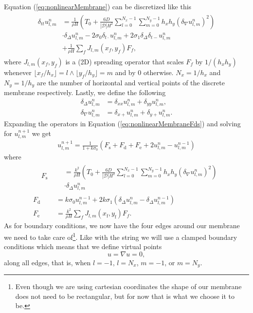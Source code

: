 \documentclass{article}
\begin{document}
Equation (\ref{eq:nonlinearMembrane}) can be discretized like this
\begin{align}
  \label{eq:nonlinearMembraneFds}
  \begin{split}
  \delta_{tt} u^n_{l, m} &= \frac{1}{\rho H} \left(T_0 + \frac{6D}{|\mathcal{D}| H^2} \sum_{l=0}^{N_x-1}\sum_{m=0}^{N_y-1} h_x h_y (\delta_\nabla u^n_{l, m})^2 \right)\\
  &\cdot\delta_\Delta u^n_{l, m}- 2 \sigma_0 \delta_{t\cdot} u^n_{l, m} + 2 \sigma_1 \delta_\Delta \delta_{t-} u^n_{l, m}\\
  &+\frac{1}{\rho H}\sum_f J_{l, m}(x_f, y_f) F_f,
  \end{split}
\end{align}
where $J_{l, m}(x_f,y_f)$ is a (2D) spreading operator that scales $F_f$ by $1/(h_x h_y)$ whenever $\lfloor x_f / h_x \rfloor = l \land \lfloor y_f / h_y \rfloor = m$ and by $0$ otherwise. $N_x = 1/h_x$ and $N_y=1/h_y$ are the number of horizontal and vertical points of the discrete membrane respectively. Lastly, we define the following
\begin{align}
  \delta_\Delta u^n_{l, m} &= \delta_{xx} u^n_{l, m} + \delta_{yy} u^n_{l, m},\\
  \delta_\nabla u^n_{l, m} &= \delta_{x+} u^n_{l, m} + \delta_{y+} u^n_{l, m}.
\end{align}
%
Expanding the operators in Equation (\ref{eq:nonlinearMembraneFds}) and solving for $u^{n+1}_{l, m}$ we get 
\begin{align}
  u^{n+1}_{l, m} = \frac{1}{1 + k\sigma_0} (F_\text{s} + F_\text{d} + F_\text{e} + 2 u^n_{l, m} - u^{n-1}_{l, m})
\end{align}
where
\begin{align}
\begin{aligned}
&F_\text{s} \\
&
\end{aligned}
&\begin{aligned}
  &= \frac{k^2}{\rho H} \left(T_0 + \frac{6D}{|\mathcal{D}| H^2} \sum_{l=0}^{N_x-1}\sum_{m=0}^{N_y-1} h_x h_y(\delta_\nabla u^n_{l, m})^2 \right)\\
  &\cdot\delta_\Delta u^n_{l, m} 
  \end{aligned}\\
  F_\text{d} &= k \sigma_0 u^{n-1}_{l, m} + 2 k \sigma_1 (\delta_\Delta u^{n}_{l, m} - \delta_\Delta u^{n-1}_{l, m}) \\
  F_\text{e} &= \frac{k^2}{\rho H}\sum_f J_{l, m}(x_\text{f}, y_\text{f}) F_f.
\end{align}
%
As for boundary conditions, we now have the four edges around our membrane we need to take care of\footnote{Even though we are using cartesian coordinates the shape of our membrane does not need to be rectangular, but for now that is what we choose it to be.}.
Like with the string we will use a clamped boundary conditions which means that we define virtual points
\begin{equation}
  u = \nabla u= 0,
\end{equation}
along all edges, that is, when $l = -1$, $l = N_x$, $m = -1$, or $m = N_y$.
\end{document}
